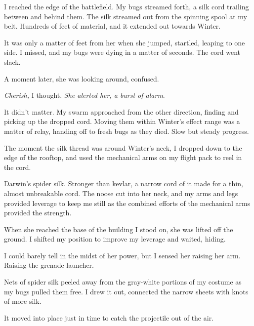 I reached the edge of the battlefield.  My bugs streamed forth, a silk cord trailing between and behind them.  The silk streamed out from the spinning spool at my belt.  Hundreds of feet of material, and it extended out towards Winter.



It was only a matter of feet from her when she jumped, startled, leaping to one side.  I missed, and my bugs were dying in a matter of seconds.  The cord went slack.



A moment later, she was looking around, confused.



\emph{Cherish, }I thought.\emph{  She alerted her, a burst of alarm}.



It didn't matter.  My swarm approached from the other direction, finding and picking up the dropped cord.  Moving them within Winter's effect range was a matter of relay, handing off to fresh bugs as they died.  Slow but steady progress.



The moment the silk thread was around Winter's neck, I dropped down to the edge of the rooftop, and used the mechanical arms on my flight pack to reel in the cord.



Darwin's spider silk.  Stronger than kevlar, a narrow cord of it made for a thin, almost unbreakable cord.  The noose cut into her neck, and my arms and legs provided leverage to keep me still as the combined efforts of the mechanical arms provided the strength.



When she reached the base of the building I stood on, she was lifted off the ground.  I shifted my position to improve my leverage and waited, hiding.



I could barely tell in the midst of her power, but I sensed her raising her arm.  Raising the grenade launcher.



Nets of spider silk peeled away from the gray-white portions of my costume as my bugs pulled them free.  I drew it out, connected the narrow sheets with knots of more silk.



It moved into place just in time to catch the projectile out of the air.



